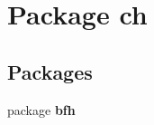 \section{Package ch}
\label{namespacech}
\subsection*{Packages}
\begin{DoxyCompactItemize}
\item 
package {\bf bfh}
\end{DoxyCompactItemize}
